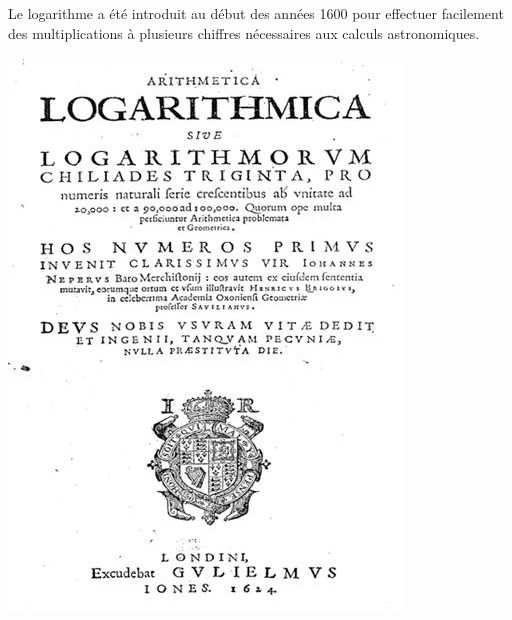 \documentclass[11pt,class=report,crop=false]{standalone}
\begin{document}
\begin{cours}
\sauteligne

Le logarithme a été introduit au début des années 1600 pour effectuer facilement des multiplications à plusieurs chiffres nécessaires aux calculs astronomiques.

\begin{center}
\includegraphics[scale=\myscale,scale=0.55,angle=-0.5]{briggs_1}\qquad\qquad

\end{center}
\end{cours}
\end{document}

